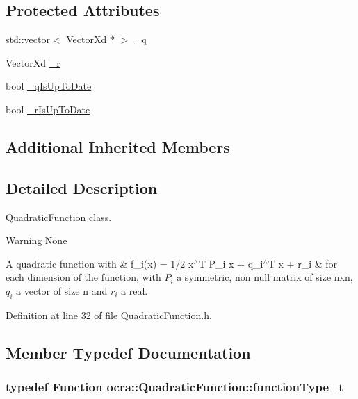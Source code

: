 \subsection*{Protected Attributes}
\begin{DoxyCompactItemize}
\item 
std\+::vector$<$ Vector\+Xd $\ast$ $>$ \hyperlink{classocra_1_1QuadraticFunction_a0019bf700f128841e50dbceaa4c75dd2}{\+\_\+q}
\item 
Vector\+Xd \hyperlink{classocra_1_1QuadraticFunction_a56771e89a23a61fcc15cfd4d10c6956c}{\+\_\+r}
\item 
bool \hyperlink{classocra_1_1QuadraticFunction_adc8b30315f5cef54f2318c93844a6a66}{\+\_\+q\+Is\+Up\+To\+Date}
\item 
bool \hyperlink{classocra_1_1QuadraticFunction_a9862b46e064bccd9e83b10e9ceb4d2f0}{\+\_\+r\+Is\+Up\+To\+Date}
\end{DoxyCompactItemize}
\subsection*{Additional Inherited Members}


\subsection{Detailed Description}
Quadratic\+Function class. 

\begin{DoxyWarning}{Warning}
None
\end{DoxyWarning}
A quadratic function with \& f\+\_\+i(x) = 1/2 x$^\wedge$T P\+\_\+i x + q\+\_\+i$^\wedge$T x + r\+\_\+i \& for each dimension of the function, with $ P_i $ a symmetric, non null matrix of size nxn, $ q_i $ a vector of size n and $ r_i $ a real. 

Definition at line 32 of file Quadratic\+Function.\+h.



\subsection{Member Typedef Documentation}
\subsubsection[{\texorpdfstring{function\+Type\+\_\+t}{functionType_t}}]{\setlength{\rightskip}{0pt plus 5cm}typedef {\bf Function} {\bf ocra\+::\+Quadratic\+Function\+::function\+Type\+\_\+t}}\hypertarget{classocra_1_1QuadraticFunction_a224eecd300c5a16599ebd6e4eff5d9d7}{}\label{classocra_1_1QuadraticFunction_a224eecd300c5a16599ebd6e4eff5d9d7}


